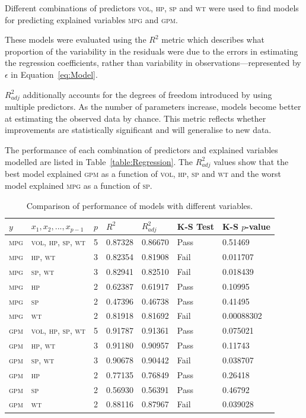 \documentclass[a4paper,10pt,twocolumn]{article}
\newcommand{\MPG}{\textsc{mpg}\xspace}
\newcommand{\GPM}{\textsc{gpm}\xspace}
\newcommand{\VOL}{\textsc{vol}\xspace}
\newcommand{\HP}{\textsc{hp}\xspace}
\newcommand{\SP}{\textsc{sp}\xspace}
\newcommand{\WT}{\textsc{wt}\xspace}
\begin{document}
Different combinations of predictors \VOL, \HP, \SP and \WT were used to find 
models for predicting explained variables \MPG and \GPM.

These models were evaluated using the $R^2$ metric which describes what  
proportion of the variability in the residuals were due to the errors in 
estimating the regression coefficients, rather than variability in 
observations---represented by $\epsilon$ in Equation~\vref{eq:Model}.

$R_{adj}^2$ additionally accounts for the degrees of freedom introduced by 
using multiple predictors. As the number of parameters increase, models become 
better at estimating the observed data by chance. This metric reflects whether 
improvements are statistically significant and will generalise to new data.

The performance of each combination of predictors and explained variables 
modelled are listed in Table~\vref{table:Regression}. The $R_{adj}^2$ values 
show that the best model explained \GPM as a function of \VOL, \HP, \SP and 
\WT and the worst model explained \MPG as a function of \SP.

\begin{table}
    \centering
    \begin{tabular}{lllllll}
        \toprule
        $y$ & $x_1, x_2, ..., x_{p-1}$ & $p$ & $R^2$ & $R_{adj}^2$ & K-S Test & 
        K-S $p$-value \\
        \midrule
        \MPG & \VOL, \HP, \SP, \WT & 5 & 0.87328 & 0.86670 & Pass & 0.51469 \\
        \MPG & \HP, \WT            & 3 & 0.82354 & 0.81908 & Fail & 0.011707 \\
        \MPG & \SP, \WT            & 3 & 0.82941 & 0.82510 & Fail & 0.018439 \\
        \MPG & \HP                 & 2 & 0.62387 & 0.61917 & Pass & 0.10995 \\
        \MPG & \SP                 & 2 & 0.47396 & 0.46738 & Pass & 0.41495 \\
        \MPG & \WT                 & 2 & 0.81918 & 0.81692 & Fail & 0.00088302\\
        \GPM & \VOL, \HP, \SP, \WT & 5 & 0.91787 & 0.91361 & Pass & 0.075021 \\
        \GPM & \HP, \WT            & 3 & 0.91180 & 0.90957 & Pass & 0.11743 \\
        \GPM & \SP, \WT            & 3 & 0.90678 & 0.90442 & Fail & 0.038707 \\
        \GPM & \HP                 & 2 & 0.77135 & 0.76849 & Pass & 0.26418 \\
        \GPM & \SP                 & 2 & 0.56930 & 0.56391 & Pass & 0.46792 \\
        \GPM & \WT                 & 2 & 0.88116 & 0.87967 & Fail & 0.039028 \\
        \bottomrule
    \end{tabular}
    \caption{Comparison of performance of models with different variables.}
    \label{table:Regression}
\end{table}
    
\end{document}
